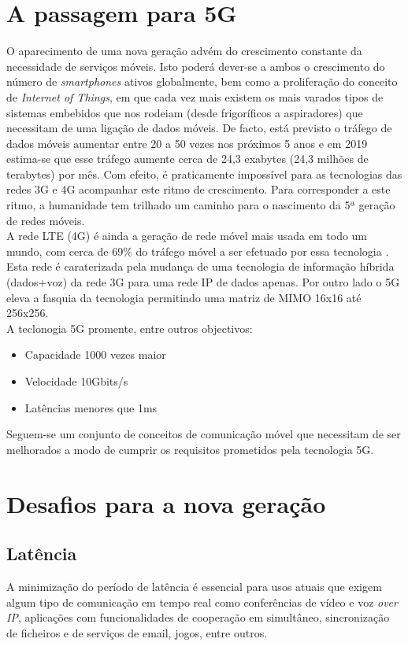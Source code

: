 \documentclass{llncs}
\begin{document}
\section{A passagem para 5G}
\hspace*{1.5em}O aparecimento de uma nova geração advém do crescimento constante da necessidade de serviços móveis. Isto poderá dever-se a ambos o crescimento do número de \textit{smartphones} ativos globalmente, bem como a proliferação do conceito de \textit{Internet of Things}, em que cada vez mais existem os mais varados tipos de sistemas embebidos que nos rodeiam (desde frigoríficos a aspiradores) que necessitam de uma ligação de dados móveis. De facto, está previsto o tráfego de dados móveis aumentar entre 20 a 50 vezes nos próximos 5 anos e em 2019 estima-se que esse tráfego aumente cerca de 24,3 exabytes (24,3 milhões de terabytes) por mês. \cite{Fei} Com efeito, é praticamente impossível para as tecnologias das redes 3G e 4G acompanhar este ritmo de crescimento. Para corresponder a este ritmo, a humanidade tem trilhado um caminho para o nascimento da 5ª geração de redes móveis.
\\
\hspace*{1.5em}A rede LTE (4G) é ainda a geração de rede móvel mais usada em todo um mundo, com cerca de 69\% do tráfego móvel a ser efetuado por essa tecnologia \cite{cisco}. Esta rede é caraterizada pela mudança de uma tecnologia de informação híbrida (dados+voz) da rede 3G para uma rede IP de dados apenas.
Por outro lado o 5G eleva a fasquia da tecnologia permitindo uma matriz de MIMO 16x16 até 256x256. \\
A teclonogia 5G promente, entre outros objectivos:
\begin{itemize}
    \item Capacidade 1000 vezes maior
    \item Velocidade 10Gbits/s
    \item Latências menores que 1ms
\end{itemize}
Seguem-se um conjunto de conceitos de comunicação móvel que necessitam de ser melhorados a modo de cumprir os requisitos prometidos pela tecnologia 5G.

\section{Desafios para a nova geração}

\subsection{Latência}
A minimização do período de latência é essencial para usos atuais que exigem algum tipo de comunicação em tempo real como conferências de vídeo e voz \textit{over IP}, aplicações com funcionalidades de cooperação em simultâneo, sincronização de ficheiros e de serviços de email, jogos, entre outros.
\end{document}
